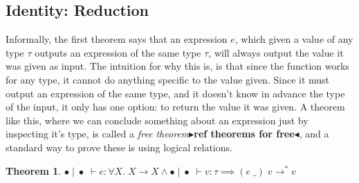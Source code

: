 \documentclass[twoside,11pt,openright]{report}
\newtheorem{theorem}{Theorem}
\theoremstyle{definition}
\newcommand{\expr}{e}
\newcommand{\val}{v}
\newcommand{\Tvar}{X}
\newcommand{\Tapp}[1]{#1\;\_}
\newcommand{\Tfunc}[2]{#1 \rightarrow #2}
\newcommand{\Tall}[2]{\forall #1.\; #2}
\newcommand{\typ}{\tau}
\newcommand{\emptenv}{\bullet}
\newcommand{\empvenv}{\bullet}
\newcommand{\jdg}[4]{#1 \; | \; #2 \; \vdash #3 : #4}
\newcommand{\stepS}{\rightarrow^*}
\newcommand{\todo}[1]{{\color[rgb]{.5,0,0}\textbf{$\blacktriangleright$#1$\blacktriangleleft$}}}
\begin{document}
\subsection{Identity: Reduction}
Informally, the first theorem says that an expression $\expr$, which given a value of any type $\typ$ outputs an expression of the same type $\typ$, will always output the value it was given as input. The intuition for why this is, is that since the function works for any type, it cannot do anything specific to the value given. Since it must output an expression of the same type, and it doesn't know in advance the type of the input, it only has one option: to return the value it was given. A theorem like this, where we can conclude something about an expression just by inspecting it's type, is called a \textit{free theorem}\todo{ref theorems for free}, and a standard way to prove these is using logical relations.
\begin{theorem}\label{thm:identity_reduction}
  $\jdg{\emptenv}{\empvenv}{\expr}{\Tall{\Tvar}{\Tfunc{\Tvar}{\Tvar}}} \land
  \jdg{\emptenv}{\empvenv}{\val}{\typ} \implies 
  (\Tapp{\expr}) \; \val \stepS \val$
\end{theorem}
\end{document}
